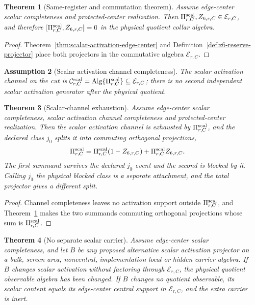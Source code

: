 \documentclass[11pt]{article}
\newtheorem{theorem}{Theorem}[section]
\newtheorem{assumption}[theorem]{Assumption}
\theoremstyle{remark}
\theoremstyle{plain}
\begin{document}
\begin{theorem}[Same-register and commutation theorem]
\label{thm:scalar-z6-same-register-commute}
Assume edge-center scalar completeness and protected-center realization.
Then \(\Pi^{\rm scal}_{r,C},Z_{6,r,C}\in\mathcal E_{r,C}\), and therefore
\([\Pi^{\rm scal}_{r,C},Z_{6,r,C}]=0\) in the physical quotient collar algebra.
\end{theorem}

\begin{proof}
Theorem~\ref{thm:scalar-activation-edge-center} and
Definition~\ref{def:z6-reserve-projector} place both projectors in the
commutative algebra \(\mathcal E_{r,C}\).
\end{proof}

\begin{assumption}[Scalar activation channel completeness]
\label{ass:scalar-activation-channel-completeness}
The scalar activation channel on the cut is
\(\mathcal C^{\rm scal}_{r,C}=\operatorname{Alg}\{\Pi^{\rm scal}_{r,C}\}
\subseteq\mathcal E_{r,C}\); there is no second independent scalar activation
generator after the physical quotient.
\end{assumption}

\begin{theorem}[Scalar-channel exhaustion]
\label{thm:scalar-channel-exhaustion}
Assume edge-center scalar completeness, scalar activation channel
completeness and protected-center realization. Then the scalar activation
channel is exhausted by \(\Pi^{\rm scal}_{r,C}\), and the declared class
\(j_0\) splits it into commuting orthogonal projections,
\[
\Pi^{\rm scal}_{r,C}=\Pi^{\rm scal}_{r,C}(1-Z_{6,r,C})+\Pi^{\rm scal}_{r,C}Z_{6,r,C}.
\]
The first summand survives the declared \(j_0\) event and the second is
blocked by it. Calling \(j_0\) the physical blocked class is a separate
attachment, and the total projector gives a different split.
\end{theorem}

\begin{proof}
Channel completeness leaves no activation support outside
\(\Pi^{\rm scal}_{r,C}\), and
Theorem~\ref{thm:scalar-z6-same-register-commute} makes the two summands
commuting orthogonal projections whose sum is \(\Pi^{\rm scal}_{r,C}\).
\end{proof}

\begin{theorem}[No separate scalar carrier]
\label{thm:no-separate-scalar-carrier}
Assume edge-center scalar completeness, and let \(B\) be any proposed
alternative scalar activation projector on a bulk, screen-area, noncentral,
implementation-local or hidden-carrier algebra. If \(B\) changes scalar
activation without factoring through \(\mathcal E_{r,C}\), the physical
quotient observable algebra has been changed. If \(B\) changes no quotient
observable, its scalar content equals its edge-center central support in
\(\mathcal E_{r,C}\), and the extra carrier is inert.
\end{theorem}
\end{document}
